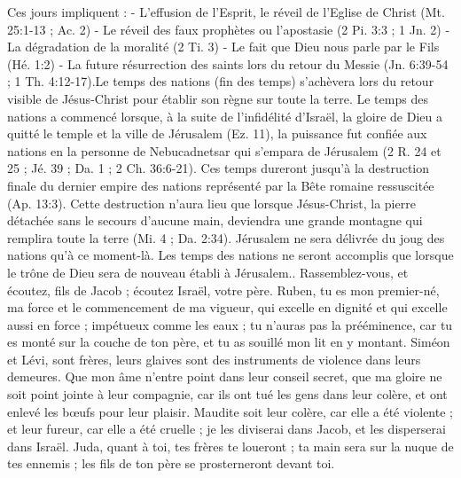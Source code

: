 \begin{multicols}{2}
{Ces jours impliquent :
- L'effusion de l'Esprit, le réveil de l'Eglise de Christ (Mt. 25:1-13 ; Ac. 2)
- Le réveil des faux prophètes ou l'apostasie (2 Pi. 3:3 ; 1 Jn. 2)
- La dégradation de la moralité (2 Ti. 3)
- Le fait que Dieu nous parle par le Fils (Hé. 1:2)
- La future résurrection des saints lors du retour du Messie (Jn. 6:39-54 ; 1 Th. 4:12-17).Le temps des nations (fin des temps) s'achèvera lors du retour visible de Jésus-Christ pour établir son règne sur toute la terre. Le temps des nations a commencé lorsque, à la suite de l'infidélité d'Israël, la gloire de Dieu a quitté le temple et la ville de Jérusalem (Ez. 11), la puissance fut confiée aux nations en la personne de Nebucadnetsar qui s'empara de Jérusalem (2 R. 24 et 25 ; Jé. 39 ; Da. 1 ; 2 Ch. 36:6-21). Ces temps dureront jusqu'à la destruction finale du dernier empire des nations représenté par la Bête romaine ressuscitée (Ap. 13:3). Cette destruction n'aura lieu que lorsque Jésus-Christ, la pierre détachée sans le secours d'aucune main, deviendra une grande montagne qui remplira toute la terre (Mi. 4 ; Da. 2:34). Jérusalem ne sera délivrée du joug des nations qu'à ce moment-là. Les temps des nations ne seront accomplis que lorsque le trône de Dieu sera de nouveau établi à Jérusalem.}.
Rassemblez-vous, et écoutez, fils de Jacob ; écoutez Israël, votre père.
Ruben, tu es mon premier-né, ma force et le commencement de ma vigueur, qui excelle en dignité et qui excelle aussi en force ;
impétueux comme les eaux ; tu n'auras pas la prééminence, car tu es monté sur la couche de ton père, et tu as souillé mon lit en y montant.
Siméon et Lévi, sont frères, leurs glaives sont des instruments de violence dans leurs demeures.
Que mon âme n'entre point dans leur conseil secret, que ma gloire ne soit point jointe à leur compagnie, car ils ont tué les gens dans leur colère, et ont enlevé les bœufs pour leur plaisir.
Maudite soit leur colère, car elle a été violente ; et leur fureur, car elle a été cruelle ; je les diviserai dans Jacob, et les disperserai dans Israël.
Juda, quant à toi, tes frères te loueront ; ta main sera sur la nuque de tes ennemis ; les fils de ton père se prosterneront devant toi.

\end{multicols}
